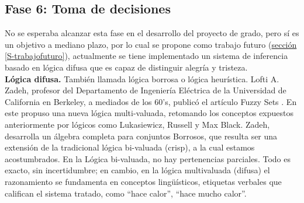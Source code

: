 \documentclass[11pt,lettersize]{article} %
\newcommand{\seccion}[1]{\hyperref[{#1}]{sección \ref*{#1}}}
\begin{document}


\subsection{Fase 6: Toma de decisiones}
\label{S-fase-6}
No se esperaba alcanzar esta fase en el desarrollo del proyecto de grado, pero sí es un objetivo a mediano plazo, por lo cual se propone como trabajo futuro (\seccion{S-trabajofuturo}), actualmente se tiene implementado un sistema de inferencia basado en lógica difusa que es capaz de distinguir alegría y tristeza.\\

\textbf{Lógica difusa.}
También llamada lógica borrosa o lógica heurística. Lofti A. Zadeh, profesor del Departamento de Ingeniería Eléctrica de la Universidad de California en Berkeley, a mediados de los 60's, publicó el artículo Fuzzy Sets \cite{Zadeh1965}. En este propuso una nueva lógica multi-valuada, retomando los conceptos expuestos anteriormente por lógicos como Lukasiewicz, Russell y Max Black. Zadeh, desarrolla un álgebra completa para conjuntos Borrosos, que resulta ser una extensión de la tradicional lógica bi-valuada (crisp), a la cual estamos acostumbrados. En la Lógica bi-valuada, no hay pertenencias parciales. Todo es exacto, sin incertidumbre; en cambio, en la lógica multivaluada (difusa) el razonamiento se fundamenta en conceptos lingüísticos, etiquetas verbales que califican el sistema tratado, como ``hace calor'', ``hace mucho calor''.

\end{document}
